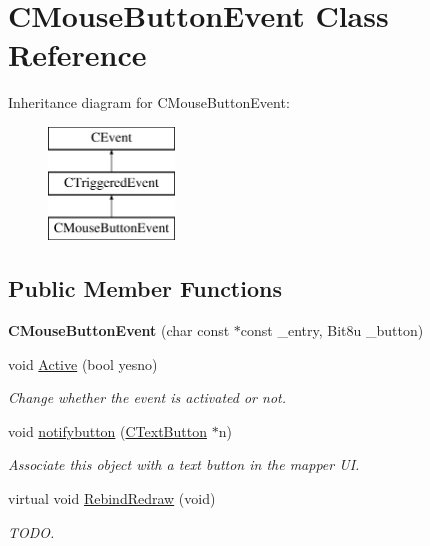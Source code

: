 \hypertarget{classCMouseButtonEvent}{\section{C\-Mouse\-Button\-Event Class Reference}
\label{classCMouseButtonEvent}
}
Inheritance diagram for C\-Mouse\-Button\-Event\-:\begin{figure}[H]
\begin{center}
\leavevmode
\includegraphics[height=3.000000cm]{classCMouseButtonEvent}
\end{center}
\end{figure}
\subsection*{Public Member Functions}
\begin{DoxyCompactItemize}
\item 
\hypertarget{classCMouseButtonEvent_aab5431e6106d08ed60f341ae739dd13d}{{\bfseries C\-Mouse\-Button\-Event} (char const $\ast$const \-\_\-entry, Bit8u \-\_\-button)}\label{classCMouseButtonEvent_aab5431e6106d08ed60f341ae739dd13d}

\item 
\hypertarget{classCMouseButtonEvent_a2ef3b6085ec0672dedad95bafd053147}{void \hyperlink{classCMouseButtonEvent_a2ef3b6085ec0672dedad95bafd053147}{Active} (bool yesno)}\label{classCMouseButtonEvent_a2ef3b6085ec0672dedad95bafd053147}

\begin{DoxyCompactList}\small\item\em Change whether the event is activated or not. \end{DoxyCompactList}\item 
\hypertarget{classCMouseButtonEvent_a399785cb15dcc0b60aebbe5907408f7c}{void \hyperlink{classCMouseButtonEvent_a399785cb15dcc0b60aebbe5907408f7c}{notifybutton} (\hyperlink{classCTextButton}{C\-Text\-Button} $\ast$n)}\label{classCMouseButtonEvent_a399785cb15dcc0b60aebbe5907408f7c}

\begin{DoxyCompactList}\small\item\em Associate this object with a text button in the mapper U\-I. \end{DoxyCompactList}\item 
\hypertarget{classCMouseButtonEvent_ab3374e3e273a1f7f1e3f1ce921c956d0}{virtual void \hyperlink{classCMouseButtonEvent_ab3374e3e273a1f7f1e3f1ce921c956d0}{Rebind\-Redraw} (void)}\label{classCMouseButtonEvent_ab3374e3e273a1f7f1e3f1ce921c956d0}

\begin{DoxyCompactList}\small\item\em T\-O\-D\-O. \end{DoxyCompactList}\end{DoxyCompactItemize}
